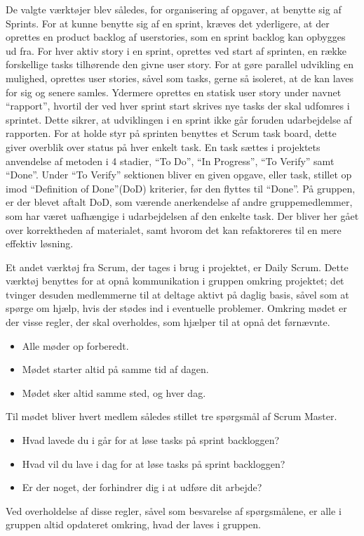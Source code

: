 De valgte værktøjer blev således, for organisering af opgaver, at benytte sig af Sprints.
For at kunne benytte sig af en sprint, kræves det yderligere, at der oprettes en product backlog af userstories, som en sprint backlog kan opbygges ud fra.
For hver aktiv story i en sprint, oprettes ved start af sprinten, en række forskellige tasks tilhørende den givne user story.
For at gøre parallel udvikling en mulighed, oprettes user stories, såvel som tasks, gerne så isoleret, at de kan laves for sig og senere samles.
Ydermere oprettes en statisk user story under navnet ``rapport'', hvortil der ved hver sprint start skrives nye tasks der skal udfomres i sprintet. 
Dette sikrer, at udviklingen i en sprint ikke går foruden udarbejdelse af rapporten.
For at holde styr på sprinten benyttes et Scrum task board, dette giver overblik over status på hver enkelt task.
En task sættes i projektets anvendelse af metoden i 4 stadier, ``To Do'', ``In Progress'', ``To Verify'' samt ``Done''.
Under ``To Verify'' sektionen bliver en given opgave, eller task, stillet op imod ``Definition of Done''(DoD) kriterier, før den flyttes til ``Done''.
På gruppen, er der blevet aftalt DoD, som værende anerkendelse af andre gruppemedlemmer, som har været uafhængige i udarbejdelsen af den enkelte task.
Der bliver her gået over korrektheden af materialet, samt hvorom det kan refaktoreres til en mere effektiv løsning.

Et andet værktøj fra Scrum, der tages i brug i projektet, er Daily Scrum.
Dette værktøj benyttes for at opnå kommunikation i gruppen omkring projektet; det tvinger desuden medlemmerne til at deltage aktivt på daglig basis, såvel som at spørge om hjælp, hvis der stødes ind i eventuelle problemer.
Omkring mødet er der visse regler, der skal overholdes, som hjælper til at opnå det førnævnte.
\begin{itemize}
  \item Alle møder op forberedt.
  \item Mødet starter altid på samme tid af dagen.
  \item Mødet sker altid samme sted, og hver dag.
\end{itemize}
Til mødet bliver hvert medlem således stillet tre spørgsmål af Scrum Master.
\begin{itemize}
  \item Hvad lavede du i går for at løse tasks på sprint backloggen?
  \item Hvad vil du lave i dag for at løse tasks på sprint backloggen?
  \item Er der noget, der forhindrer dig i at udføre dit arbejde?
\end{itemize}
Ved overholdelse af disse regler, såvel som besvarelse af spørgsmålene, er alle i gruppen altid opdateret omkring, hvad der laves i gruppen.

